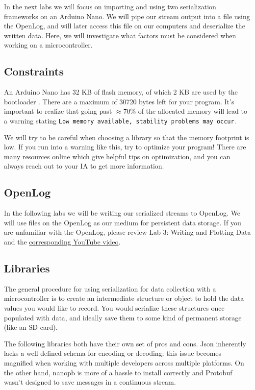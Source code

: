 In the next labs we will focus on importing and using two serialization frameworks on an Arduino Nano. We will pipe our stream output into a file using the OpenLog, and will later access this file on our computers and deserialize the written data. Here, we will investigate what factors must be considered when working on a microcontroller. 

\subsection{Constraints}
An Arduino Nano has 32 KB of flash memory, of which 2 KB are used by the bootloader \cite{arduino_nano_specs}. There are a maximum of 30720 bytes left for your program.  It's important to realize that going past $\approx 70$\% of the allocated memory will lead to a warning stating \texttt{Low memory available, stability problems may occur}. 

We will try to be careful when choosing a library so that the memory footprint is low. If you run into a warning like this, try to optimize your program! There are many resources online which give helpful tips on optimization, and you can always reach out to your IA to get more information. 

\subsection{OpenLog}
In the following labs we will be writing our serialized streams to OpenLog. We will use files on the OpenLog as our medium for persistent data storage. If you are unfamiliar with the OpenLog, please review Lab 3:  Writing and Plotting Data and the \href{https://www.youtube.com/watch?v=FhgAi-ju6Z4}{corresponding YouTube video}.

\subsection{Libraries}
The general procedure for using serialization for data collection with a microcontroller is to create an intermediate structure or object to hold the data values you would like to record. You would serialize these structures once populated with data, and ideally save them to some kind of permanent storage (like an SD card). 

The following libraries both have their own set of pros and cons. Json inherently lacks a well-defined schema for encoding or decoding; this issue becomes magnified when working with multiple developers across multiple platforms. On the other hand, nanopb is more of a hassle to install correctly and Protobuf wasn't designed to save messages in a continuous stream.

